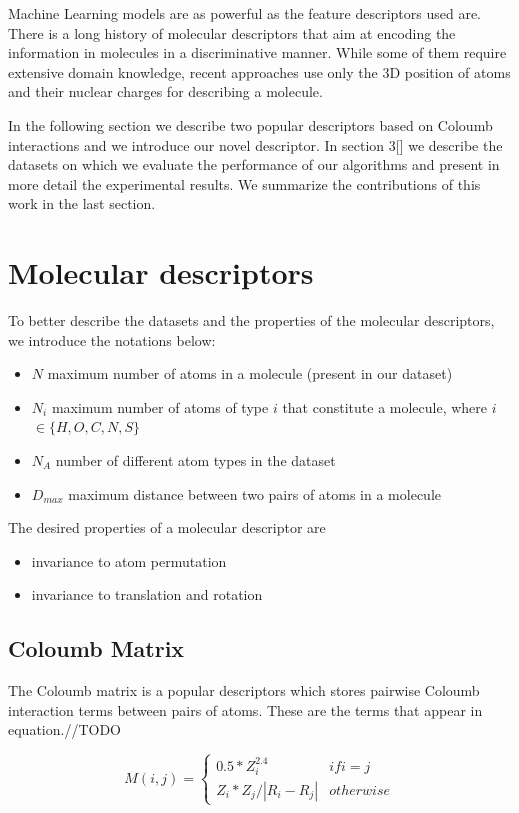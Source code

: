 \documentclass{article}
\begin{document}
Machine Learning models are as powerful as the feature descriptors used are. There is a long history of molecular descriptors \cite{todeschini2000handbook} that aim at encoding the information in molecules in a discriminative manner. While some of them require extensive domain knowledge, recent approaches \cite{initialcoloumb} use only the 3D position of atoms and their nuclear charges for describing a molecule.

In the following section we describe two popular descriptors based on Coloumb interactions and we introduce our novel descriptor. In section 3[] we describe the datasets on which we evaluate the performance of our algorithms and present in more detail the experimental results. We summarize the contributions of this work in the last section.

\section{Molecular descriptors}

To better describe the datasets and the properties of the molecular descriptors, we introduce the notations below:
\begin{itemize}
\item $N$ maximum number of atoms in a molecule (present in our dataset)
\item $N_i$ maximum number of atoms of type $i$ that constitute a molecule, where $i$ $\in \{H, O, C, N, S\}$
\item $N_A$ number of different atom types in the dataset
\item $D_{max}$ maximum distance between two pairs of atoms in a molecule
\end{itemize}
The desired properties of a molecular descriptor are
\begin{itemize}
 \item invariance to atom permutation
 \item invariance to translation and rotation
\end{itemize}

\subsection{Coloumb Matrix}
The Coloumb matrix is a popular descriptors which stores pairwise Coloumb interaction terms between pairs of atoms. These are the terms that appear in equation.//TODO

\[M(i,j) = \left\{
  \begin{array}{lr}
    0.5*Z_i^2.4 & if i = j\\
    Z_i * Z_j / |R_i - R_j| & otherwise
  \end{array}
\right.
\]
\end{document}

